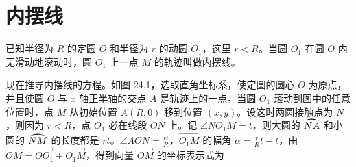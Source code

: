 \section{内摆线}

已知半径为 $R$ 的定圆 $O$ 和半径为 $r$ 的动圆 $O_1$，这里 $r<R$。当圆 $O_1$ 在圆 $O$ 内无滑动地滚动时，圆 $O_1$ 上一点 $M$ 的轨迹叫做内摆线。

\noindent
\begin{minipage}[c]{0.54\textwidth}
  \setlength{\parindent}{2em}\indent
  现在推导内摆线的方程。如图 24.1，选取直角坐标系，使定圆的圆心 $O$ 为原点，并且使圆 $O$ 与 $x$ 轴正半轴的交点 $A$ 是轨迹上的一点。当圆 $O_1$ 滚动到图中的任意位置时，点 $M$ 从初始位置 $A(R, 0)$ 移到位置 $(x, y)$。设这时两圆接触点为 $N$，则因为 $r<R$，点 $O_1$ 必在线段 $ON$ 上。记 $\angle NO_1M=t$，则大圆的 $\arc{NA}$ 和小圆的 $\arc{NM}$ 的长度都是 $rt$。$\angle AON = \frac{rt}{R}$，$\overrightarrow{O_1M}$ 的幅角 $\alpha = \frac{r}{R}t - t$，由 $\overrightarrow{OM} = \overrightarrow{OO_1} + \overrightarrow{O_1M}$，得到向量 $\overrightarrow{OM}$ 的坐标表示式为
\end{minipage}
\hfill

